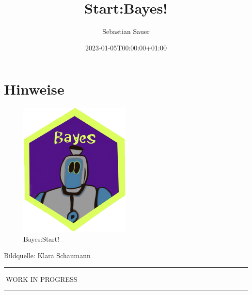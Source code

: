 \documentclass[
  a4paper,
  DIV=11]{scrreprt}
\title{Start:Bayes!}
\author{Sebastian Sauer}
\date{2023-01-05T00:00:00+01:00}
\renewcommand*\contentsname{Inhaltsverzeichnis}
\newcommand\contentsname{Inhaltsverzeichnis}
\theoremstyle{definition}
\theoremstyle{remark}
\begin{document}
\maketitle
\ifdefined\Shaded\renewenvironment{Shaded}{\begin{tcolorbox}[sharp corners, enhanced, borderline west={3pt}{0pt}{shadecolor}, breakable, boxrule=0pt, frame hidden, interior hidden]}{\end{tcolorbox}}\fi

\renewcommand*\contentsname{Inhaltsverzeichnis}
{
\hypersetup{linkcolor=}
\setcounter{tocdepth}{2}
\tableofcontents
}

\hypertarget{hinweise}{%
\chapter*{Hinweise}\label{hinweise}}

\begin{figure}

{\centering \includegraphics[width=0.5\textwidth,height=\textheight]{./img/Golem_hex.png}

}

\caption{Bayes:Start!}

\end{figure}

Bildquelle: Klara Schaumann

\begin{center}\rule{0.5\linewidth}{0.5pt}\end{center}

🚧WORK IN PROGRESS🚧

\begin{center}\rule{0.5\linewidth}{0.5pt}\end{center}
\end{document}
